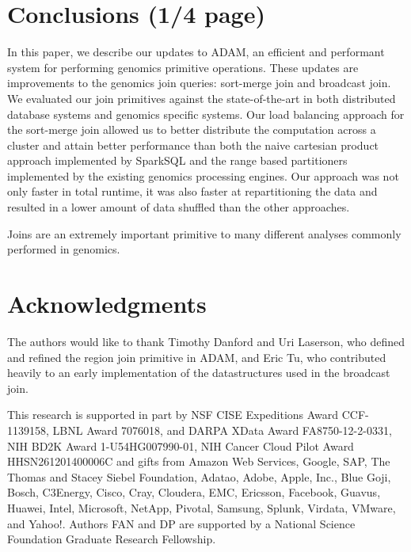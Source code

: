 \documentclass{vldb}
\begin{document}
\section{Conclusions  (1/4 page)}
\label{sec:conclusions}

In this paper, we describe our updates to ADAM, an efficient and performant system
for performing genomics primitive operations. These updates are improvements to 
the genomics join queries: sort-merge join and broadcast join. We evaluated our join
primitives against the state-of-the-art in both distributed database systems and genomics
specific systems. Our load balancing approach for the sort-merge join allowed us to 
better distribute the computation across a cluster and attain better performance than 
both the naive cartesian product approach implemented by SparkSQL and the range
based partitioners implemented by the existing genomics processing engines. Our 
approach was not only faster in total runtime, it was also faster at repartitioning the 
data and resulted in a lower amount of data shuffled than the other approaches.

Joins are an extremely important primitive to many different analyses commonly 
performed in genomics. 

\balance

\section{Acknowledgments}

The authors would like to thank Timothy Danford and Uri Laserson, who defined
and refined the region join primitive in \textsc{ADAM}, and Eric Tu, who
contributed heavily to an early implementation of the datastructures used in
the broadcast join.

This research is supported in part by NSF CISE Expeditions Award CCF-1139158,
LBNL Award 7076018, and DARPA XData Award FA8750-12-2-0331, NIH BD2K Award
1-U54HG007990-01, NIH Cancer Cloud Pilot Award \linebreak HHSN261201400006C and gifts
from Amazon Web Services, Google, SAP,  The Thomas and Stacey Siebel
Foundation, Adatao, Adobe, Apple, Inc., Blue Goji, Bosch, C3Energy, Cisco,
Cray, Cloudera, EMC, Ericsson, Facebook, Guavus, Huawei, Intel, Microsoft,
NetApp, Pivotal, Samsung, Splunk, Virdata, VMware, and Yahoo!. Authors FAN  and DP are
supported by a National Science Foundation Graduate Research Fellowship.



\end{document}
